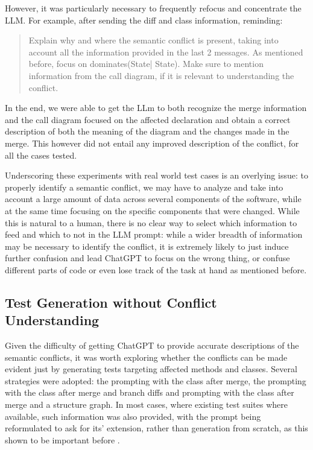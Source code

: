 However, it was particularly necessary to frequently refocus and concentrate the LLM. For example, after sending the diff and class information, reminding:

\begin{quote}
Explain why and where the semantic conflict is present, taking into account all the information provided in the last 2 messages. As mentioned before, focus on dominates(State| State). Make sure to mention information from the call diagram, if it is relevant to understanding the conflict.
\end{quote}

In the end, we were able to get the LLm to both recognize the merge information and the call diagram focused on the affected declaration and obtain a correct description of both the meaning of the diagram and the changes made in the merge. This however did not entail any improved description of the conflict, for all the cases tested.

Underscoring these experiments with real world test cases is an overlying issue: to properly identify a semantic conflict, we may have to analyze and take into account a large amount of data across several components of the software, while at the same time focusing on the specific components that were changed. While this is natural to a human, there is no clear way to select which information to feed and which to not in the LLM prompt: while a wider breadth of information may be necessary to identify the conflict, it is extremely likely to just induce further confusion and lead ChatGPT to focus on the wrong thing, or confuse different parts of code or even lose track of the task at hand as mentioned before.

\subsection{Test Generation without Conflict Understanding}

Given the difficulty of getting ChatGPT to provide accurate descriptions of the semantic conflicts, it was worth exploring whether the conflicts can be made evident just by generating tests targeting affected methods and classes. Several strategies were adopted: the prompting with the class after merge, the prompting with the class after merge and branch diffs and prompting with the class after merge and a structure graph. In most cases, where existing test suites where available, such information was also provided, with the prompt being reformulated to ask for its' extension, rather than generation from scratch, as this shown to be important before \cite{kn:githubcopilot}.

